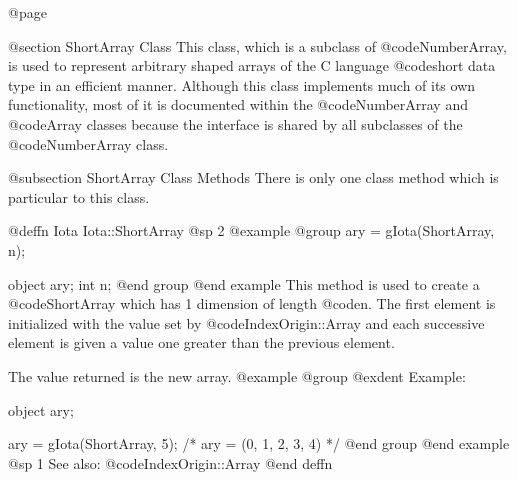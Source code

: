 @page

@section  ShortArray Class
This class, which is a subclass of @code{NumberArray}, is used to
represent arbitrary shaped arrays of the C language @code{short} data
type in an efficient manner.  Although this class implements much of its
own functionality, most of it is documented within the @code{NumberArray}
and @code{Array} classes because the interface is shared by all
subclasses of the @code{NumberArray} class.

@subsection ShortArray Class Methods
There is only one class method which is particular to this class.








@deffn {Iota} Iota::ShortArray
@sp 2
@example
@group
ary = gIota(ShortArray, n);

object    ary;
int       n;
@end group
@end example
This method is used to create a @code{ShortArray} which has 1 dimension
of length @code{n}.  The first element is initialized with the value
set by @code{IndexOrigin::Array} and each successive element is given
a value one greater than the previous element.

The value returned is the new array.
@example
@group
@exdent Example:

object  ary;

ary = gIota(ShortArray, 5);
/*  ary = (0, 1, 2, 3, 4)  */
@end group
@end example
@sp 1
See also:  @code{IndexOrigin::Array}
@end deffn








